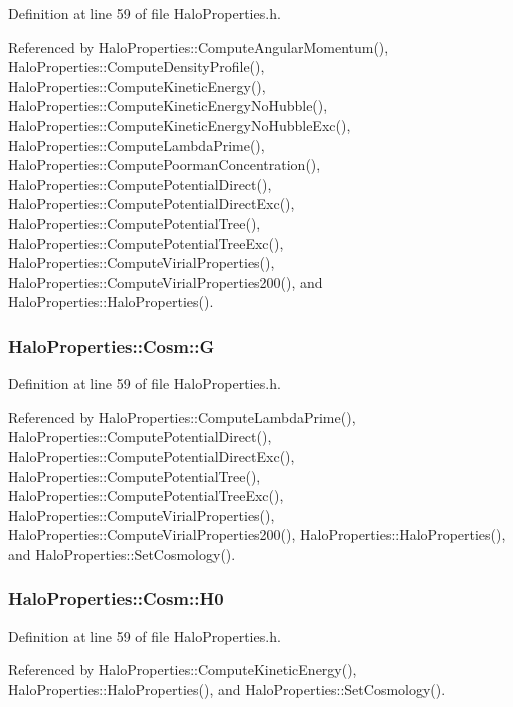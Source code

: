 Definition at line 59 of file HaloProperties.h.



Referenced by HaloProperties::ComputeAngularMomentum(), HaloProperties::ComputeDensityProfile(), HaloProperties::ComputeKineticEnergy(), HaloProperties::ComputeKineticEnergyNoHubble(), HaloProperties::ComputeKineticEnergyNoHubbleExc(), HaloProperties::ComputeLambdaPrime(), HaloProperties::ComputePoormanConcentration(), HaloProperties::ComputePotentialDirect(), HaloProperties::ComputePotentialDirectExc(), HaloProperties::ComputePotentialTree(), HaloProperties::ComputePotentialTreeExc(), HaloProperties::ComputeVirialProperties(), HaloProperties::ComputeVirialProperties200(), and HaloProperties::HaloProperties().

\subsubsection[{G}]{ {\bf HaloProperties::Cosm::G}}\label{structHaloProperties_1_1Cosm_a67202a34a6239a8fbe67ebab2e83c02f}


Definition at line 59 of file HaloProperties.h.



Referenced by HaloProperties::ComputeLambdaPrime(), HaloProperties::ComputePotentialDirect(), HaloProperties::ComputePotentialDirectExc(), HaloProperties::ComputePotentialTree(), HaloProperties::ComputePotentialTreeExc(), HaloProperties::ComputeVirialProperties(), HaloProperties::ComputeVirialProperties200(), HaloProperties::HaloProperties(), and HaloProperties::SetCosmology().

\subsubsection[{H0}]{ {\bf HaloProperties::Cosm::H0}}\label{structHaloProperties_1_1Cosm_a23e9404205e6f953f71bf99f137ae687}


Definition at line 59 of file HaloProperties.h.



Referenced by HaloProperties::ComputeKineticEnergy(), HaloProperties::HaloProperties(), and HaloProperties::SetCosmology().

